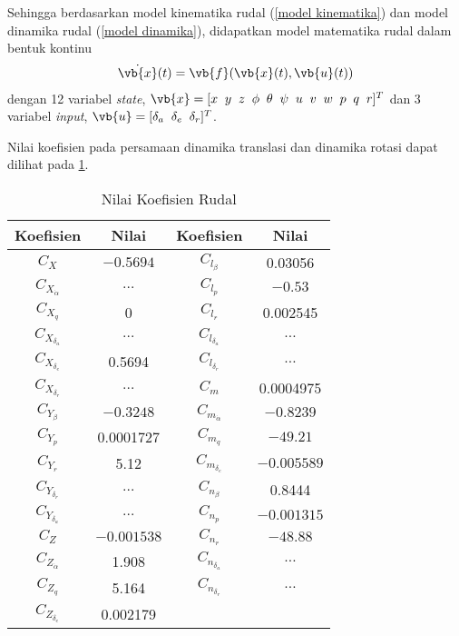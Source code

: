 Sehingga berdasarkan model kinematika rudal (\ref{model kinematika}) dan model dinamika rudal (\ref{model dinamika}), didapatkan model matematika rudal dalam bentuk kontinu  
\begin{align}
    \dot{\vb{x}}(t) = \vb{f}(\vb{x}(t),\vb{u}(t)) \label{model kontinu}
\end{align}
dengan 12 variabel \textit{state}, $\vb{x}=[x\;\;y\;\;z\;\;\phi\;\;\theta\;\;\psi\;\;u\;\;v\;\;w\;\;p\;\;q\;\;r]^T$
dan 3 variabel \textit{input}, $\vb{u}=[\delta_a\;\;\delta_e\;\;\delta_r]^T$.

Nilai koefisien pada persamaan dinamika translasi dan dinamika rotasi dapat dilihat pada \ref{tab: nilai koefisien}. 
\begin{table}[h]
 \setlength{\tabcolsep}{10pt}
 \renewcommand{\arraystretch}{1.2}
    \centering
    \caption{Nilai Koefisien Rudal}
    \begin{tabular}{|c|c|c|c|}
    \hline 
        \textbf{Koefisien} & \textbf{Nilai} & \textbf{Koefisien} & \textbf{Nilai} \\
        \hline
        $C_X$ & $-0.5694$ & $C_{l_{\beta}}$ & 0.03056 \\
        \hline
        $C_{X_{\dot{\alpha}}}$ & $\hdots$ & $C_{l_{p}}$ & $-0.53$ \\
        \hline
        $C_{X_{q}}$ & 0 & $C_{l_{r}}$ & 0.002545\\
        \hline
        $C_{X_{\delta_a}}$ & $\hdots$ & $C_{l_{\delta_a}}$ & $\hdots$ \\
        \hline
        $C_{X_{\delta_e}}$ & 0.5694 & $C_{l_{\delta_r}}$ & $\hdots$ \\
        \hline
        $C_{X_{\delta_r}}$ & $\hdots$ & $C_{m}$ & 0.0004975\\
        \hline 
        $C_{Y_{\beta}}$ & $-0.3248$ & $C_{m_{{\dot{\alpha}}}}$ & $-0.8239$\\
        \hline
        $C_{Y_{p}}$ & 0.0001727 & $C_{m_{q}}$ & $-49.21$\\
        \hline
        $C_{Y_{r}}$ & 5.12 & $C_{m_{\delta_e}}$ & $-0.005589$\\
        \hline
        $C_{Y_{\delta_r}}$ & $\hdots$ & $C_{n_{\beta}}$ & 0.8444\\
        \hline
        $C_{Y_{\delta_a}}$ & $\hdots$ & $C_{n_{p}}$ & $-0.001315$\\
        \hline
        $C_{Z}$ & $-0.001538$ & $C_{n_r}$ & $-48.88$\\
        \hline
        $C_{Z_{\dot{\alpha}}}$ & 1.908 & $C_{n_{\delta_a}}$ & $\hdots$ \\
        \hline
        $C_{Z_{q}}$ & 5.164 & $C_{n_{\delta_r}}$ & $\hdots$\\
        \hline
        $C_{Z_{\delta_e}}$ & 0.002179 & & \\
        \hline
    \end{tabular}
    \label{tab: nilai koefisien}
\end{table}

